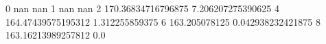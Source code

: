 0 nan nan
1 nan nan
2 170.36834716796875 7.206207275390625
4 164.47439575195312 1.312255859375
6 163.205078125 0.042938232421875
8 163.16213989257812 0.0
